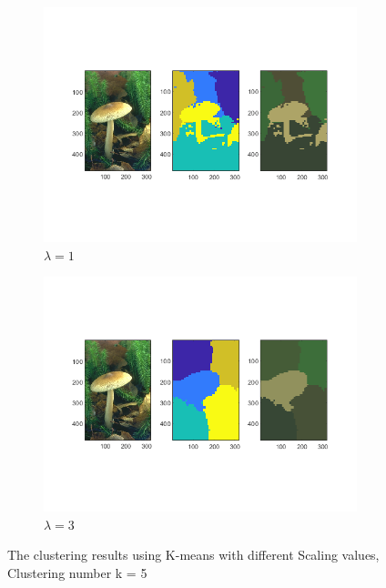 \documentclass[12pt]{article}
\begin{document}
\begin{figure}[H]
\begin{subfigure}[b]{0.475\textwidth}
		\centering 
		\includegraphics[width=\textwidth]{figs/2-c-ks-5-1}
		\caption[]%
		{{\small  $\lambda = 1$}}    
		\label{fig:mean and std of net34}
	\end{subfigure}
	\quad
	\begin{subfigure}[b]{0.475\textwidth}   
		\centering 
		\includegraphics[width=\textwidth]{figs/2-c-ks-5-3}
		\caption[]%
		{{\small  $\lambda = 3$}}    
		\label{fig:mean and std of net44}
	\end{subfigure}
	\caption[]
	{\small The clustering results using K-means with different Scaling values, Clustering number k = 5} 
	\label{fig:mean and std of nets}
\end{figure}
\end{document}

